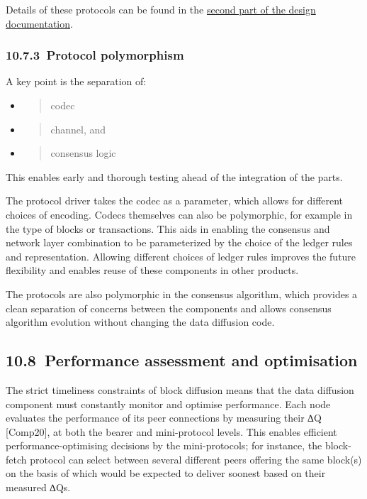 \documentclass[]{article}
\begin{document}
Details of these protocols can be found in the
\href{https://hydra.iohk.io/build/1011577/download/1/network.pdf}{{second
part of the design documentation}}.

\hypertarget{protocol-polymorphism}{%
\subsubsection{​10.7.3​~Protocol polymorphism
}\label{protocol-polymorphism}}

A key point is the separation of:

\begin{itemize}
\item
  \begin{quote}
  codec
  \end{quote}
\item
  \begin{quote}
  channel, and
  \end{quote}
\item
  \begin{quote}
  consensus logic
  \end{quote}
\end{itemize}

This enables early and thorough testing ahead of the integration of the
parts.

The protocol driver takes the codec as a parameter, which allows for
different choices of encoding. Codecs themselves can also be
polymorphic, for example in the type of blocks or transactions. This
aids in enabling the consensus and network layer combination to be
parameterized by the choice of the ledger rules and representation.
Allowing different choices of ledger rules improves the future
flexibility and enables reuse of these components in other products.

The protocols are also polymorphic in the consensus algorithm, which
provides a clean separation of concerns between the components and
allows consensus algorithm evolution without changing the data diffusion
code.

\hypertarget{performance-assessment-and-optimisation}{%
\subsection{​10.8​~Performance assessment and
optimisation}\label{performance-assessment-and-optimisation}}

The strict timeliness constraints of block diffusion means that the data
diffusion component must constantly monitor and optimise performance.
Each node evaluates the performance of its peer connections by measuring
their ∆Q {[}Comp20{]}, at both the bearer and mini-protocol levels. This
enables efficient performance-optimising decisions by the
mini-protocols; for instance, the block-fetch protocol can select
between several different peers offering the same block(s) on the basis
of which would be expected to deliver soonest based on their measured
∆Qs.
\end{document}
